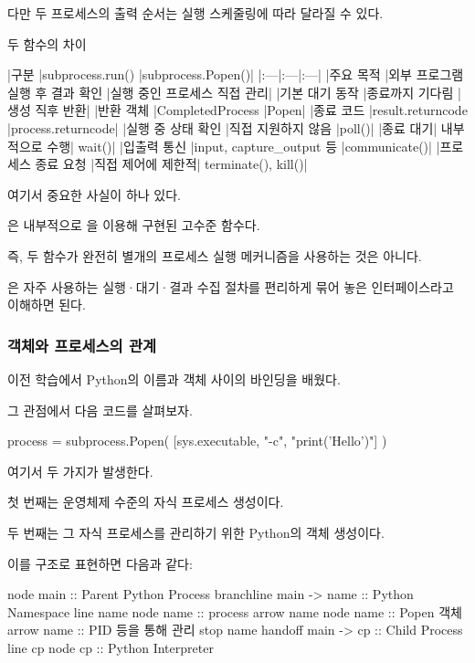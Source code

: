 다만 두 프로세스의 출력 순서는 실행 스케줄링에 따라 달라질 수 있다.

두 함수의 차이

\begin{dhktable}
|구분	|subprocess.run()	|subprocess.Popen()|
|:---|:---|:---|
|주요 목적	|외부 프로그램 실행 후 결과 확인	|실행 중인 프로세스 직접 관리|
|기본 대기 동작	|종료까지 기다림	|생성 직후 반환|
|반환 객체	|CompletedProcess	|Popen|
|종료 코드	|result.returncode	|process.returncode|
|실행 중 상태 확인	|직접 지원하지 않음	|poll()|
|종료 대기|	내부적으로 수행|	wait()|
|입출력 통신	|input, capture_output 등	|communicate()|
|프로세스 종료 요청	|직접 제어에 제한적|	terminate(), kill()|
\end{dhktable}

여기서 중요한 사실이 하나 있다.

은 내부적으로 을 이용해 구현된 고수준 함수다.

즉, 두 함수가 완전히 별개의 프로세스 실행 메커니즘을 사용하는 것은 아니다.

은 자주 사용하는 실행·대기·결과 수집 절차를 편리하게 묶어 놓은 인터페이스라고 이해하면 된다.

\subsubsection{ 객체와 프로세스의 관계}

이전 학습에서 Python의 이름과 객체 사이의 바인딩을 배웠다.

그 관점에서 다음 코드를 살펴보자.

\begin{dhkcode}
process = subprocess.Popen(
    [sys.executable, "-c", "print('Hello')"]
)
\end{dhkcode}

여기서 두 가지가 발생한다.

첫 번째는 운영체제 수준의 자식 프로세스 생성이다.

두 번째는 그 자식 프로세스를 관리하기 위한 Python의  객체 생성이다.

이를 구조로 표현하면 다음과 같다:

\begin{dhkbranch}[in=8]
node main :: Parent Python Process
branchline main -> name :: Python Namespace
line name
node name :: process
arrow name
node name :: Popen 객체
arrow name :: PID 등을 통해 관리
stop name
handoff main -> cp :: Child Process
line cp
node cp :: Python Interpreter
\end{dhkbranch}

